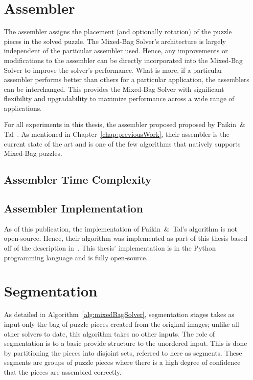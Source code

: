 \section{Assembler}\label{sec:SolverAssembler}

The assembler assigns the placement (and optionally rotation) of the puzzle pieces in the solved puzzle.  The Mixed-Bag Solver's architecture is largely independent of the particular assembler used.  Hence, any improvements or modifications to the assembler can be directly incorporated into the Mixed-Bag Solver to improve the solver's performance.  What is more, if a particular assembler performs better than others for a particular application, the assemblers can be interchanged.  This provides the Mixed-Bag Solver with significant flexibility and upgradability to maximize performance across a wide range of applications.

For all experiments in this thesis, the assembler proposed proposed by Paikin~\& Tal~\cite{paikin2015}.  As mentioned in Chapter~\ref{chap:previousWork}, their assembler is the current state of the art and is one of the few algorithms that natively supports Mixed-Bag puzzles.

\subsection{Assembler Time Complexity}


\subsection{Assembler Implementation}\label{sec:assemblerImplementation}

As of this publication, the implementation of Paikin~\&~Tal's algorithm is not open-source.  Hence, their algorithm was implemented as part of this thesis based off of the description in~\cite{paikin2015}.  This thesis' implementation is in the Python programming language and is fully open-source.

\section{Segmentation}\label{sec:Segmentation}

As detailed in Algorithm~\ref{alg:mixedBagSolver}, segmentation stages takes as input only the bag of puzzle pieces created from the original images; unlike all other solvers to date, this algorithm takes no other inputs.  The role of segmentation is to a basic provide structure to the unordered input.  This is done by partitioning the pieces into disjoint sets, referred to here as segments.  These segments are groups of puzzle pieces where there is a high degree of confidence that the pieces are assembled correctly.

